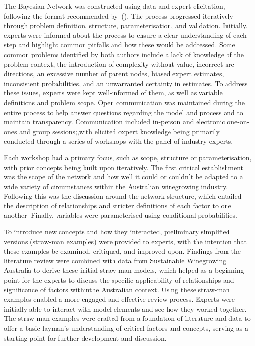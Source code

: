 \documentclass[10pt,letterpaper]{article}
\begin{document}
The Bayesian Network was constructed using data and expert elicitation, following the format recommended by~(\cite{korbBayesianArtificialIntelligence2011,pitchforthProposedValidationFramework2013}). The process progressed iteratively through problem definition, structure, parameterisation, and validation. Initially, experts were informed about the process to ensure a clear understanding of each step and highlight common pitfalls and how these would be addressed. Some common problems identified by both authors include a lack of knowledge of the problem context, the introduction of complexity without value, incorrect arc directions, an excessive number of parent nodes, biased expert estimates, inconsistent probabilities, and an unwarranted certainty in estimates. To address these issues, experts were kept well-informed of them, as well as variable definitions and problem scope. Open communication was maintained during the entire process to help answer questions regarding the model and process and to maintain transparency. Communication included in-person and electronic one-on-ones and group sessions;,with elicited oxpert knowledge being primarily conducted through a series of workshops with the panel of industry experts.

Each workshop had a primary focus, such as scope, structure or parameterisation, with prior concepts being built upon iteratively. The first critical establishment was the scope of the network and how well it could or couldn't be adapted to a wide variety of circumstances within the Australian winegrowing industry. Following this was the discussion around the network structure, which entailed the description of relationships and stricter definitions of each factor to one another. Finally, variables were parameterised using conditional probabilities.

To introduce new concepts and how they interacted, preliminary simplified versions (straw-man examples) were provided to experts, with the intention that these examples be examined, critiqued, and improved upon. Findings from the literature review were combined with data from Sustainable Winegrowing Australia to derive these initial straw-man models, which helped as a beginning point for the experts to discuss the specific applicability of relationships and significance of factors withinthe Australian context. Using these straw-man examples enabled a more engaged and effective review process. Experts were initially able to interact with model elements and see how they worked together. The straw-man examples were crafted from a foundation of literature and data to offer a basic layman's understanding of critical factors and concepts, serving as a starting point for further development and discussion. 
\end{document}
